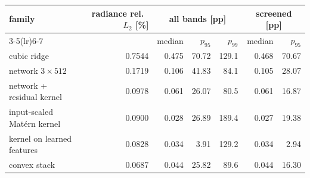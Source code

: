 \begin{tabular}{lrrrrrr}
\toprule
family & radiance rel.\ $L_2$ [\%] & \multicolumn{3}{c}{all bands [pp]} & \multicolumn{2}{c}{screened [pp]} \\
\cmidrule(lr){3-5}\cmidrule(lr){6-7}
 & & median & $p_{95}$ & $p_{99}$ & median & $p_{95}$ \\
\midrule
cubic ridge & 0.7544 & 0.475 & 70.72 & 129.1 & 0.468 & 70.67 \\
network $3\times512$ & 0.1719 & 0.106 & 41.83 & 84.1 & 0.105 & 28.07 \\
network + residual kernel & 0.0978 & 0.061 & 26.07 & 80.5 & 0.061 & 16.87 \\
input-scaled Mat\'ern kernel & 0.0900 & 0.028 & 26.89 & 189.4 & 0.027 & 19.38 \\
kernel on learned features & 0.0828 & 0.034 & 3.91 & 129.2 & 0.034 & 2.94 \\
convex stack & 0.0687 & 0.044 & 25.82 & 89.6 & 0.044 & 16.30 \\
\bottomrule
\end{tabular}
